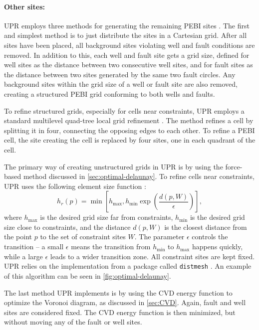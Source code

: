 \paragraph{Other sites:}
UPR employs three methods for generating the remaining PEBI sites \cite{UPR_thesis}. The first and simplest method is to just distribute the sites in a Cartesian grid. After all sites have been placed, all background sites violating well and fault conditions are removed. In addition to this, each well and fault site gets a grid size, defined for well sites as the distance between two consecutive well sites, and for fault sites as the distance between two sites generated by the same two fault circles. Any background sites within the grid size of a well or fault site are also removed, creating a structured PEBI grid conforming to both wells and faults.

To refine structured grids, especially for cells near constraints, UPR employs a standard multilevel quad-tree local grid refinement \cite[pp.49]{UPR_thesis}. The method refines a cell by splitting it in four, connecting the opposing edges to each other. To refine a PEBI cell, the site creating the cell is replaced by four sites, one in each quadrant of the cell.

The primary way of creating unstructured grids in UPR is by using the force-based method discussed in \autoref{sec:optimal-delaunay}. To refine cells near constraints, UPR uses the following element size function \cite[Equation 4.2]{UPR_thesis}:
\begin{equation}
    h_r(p) = \min \left[
        h_{\max}, h_{\min} \exp \left(
            \frac{d(p, W)}{\epsilon}
        \right) \right],
\end{equation}
where $h_{\max}$ is the desired grid size far from constraints, $h_{\min}$ is the desired grid size close to constraints, and the distance $d(p, W)$ is the closest distance from the point $p$ to the set of constraint sites $W$. The parameter $\epsilon$ controls the transition -- a small $\epsilon$ means the transition from $h_{\min}$ to $h_{\max}$ happens quickly, while a large $\epsilon$ leads to a wider transition zone. All constraint sites are kept fixed. UPR relies on the implementation from a package called \verb|distmesh| \cite{Distmesh}. An example of this algorithm can be seen in \autoref{fig:optimal-delaunay}.

The last method UPR implements is by using the CVD energy function to optimize the Voronoi diagram, as discussed in \autoref{sec:CVD}. Again, fault and well sites are considered fixed. The CVD energy function is then minimized, but without moving any of the fault or well sites.

